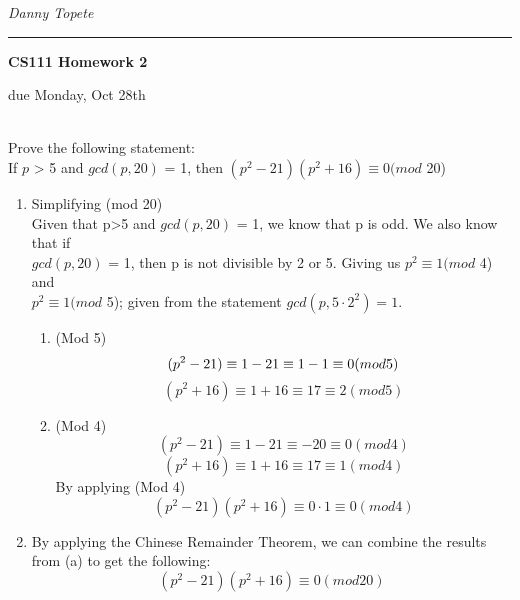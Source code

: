 \documentclass[11pt]{article}
\newcommand{\student}[1]{{\noindent\Large\em {#1} \hfill}\vskip 0.1in}
\newcommand{\assignment}[1]{\centerline{\large\bf CS111 Homework {#1}}}
\newcommand{\duedate}[1]{{\centerline{due {#1}}}}
\newcounter{prnum}
\newenvironment{problem}{{\vskip 0.2in\noindent\bf Problem
       \addtocounter{prnum}{1} \arabic{prnum}.}}{\vskip 0.1in}
\begin{document}
\student{Danny Topete} %
\vskip 0.1in\noindent\hrule\vskip 0.2in
\assignment{2}                           %
\duedate{Monday, Oct 28th}              %


\begin{problem}\\
Prove the following statement:\\
If $p$ > 5 and $gcd(p,20)$ = 1, then $(p^2 - 21)(p^2 + 16) \equiv 0 (mod$ 20)
\begin{enumerate}
  \item Simplifying (mod 20) \\
    Given that p>5 and $gcd(p,20)$ = 1, we know that p is odd.
    We also know that if \\
    $gcd(p,20)$ = 1, then p is not divisible by 2 or 5.
    Giving us $p^2 \equiv 1 (mod$ 4) and \\$p^2 \equiv 1 (mod$ 5);
    given from the statement $gcd(p, 5\cdot2^2)= 1.$\\
    \begin{enumerate}
      \item (Mod 5)\\
        \begin{equation*}
          (p^2 - 21)\equiv 1 - 21 \equiv 1-1 \equiv 0 (mod 5)\\
        \end{equation*}
        \begin{equation*}
          (p^2 + 16)\equiv 1 + 16 \equiv 17 \equiv 2 (mod 5)
        \end{equation*}
      \item (Mod 4)
        \begin{equation*}
          (p^2 - 21)\equiv 1-21 \equiv -20 \equiv 0 (mod 4)
        \end{equation*}
        \begin{equation*}
          (p^2 +16)\equiv 1 + 16 \equiv 17 \equiv 1 (mod 4)
        \end{equation*}
        By applying (Mod 4)
        \begin{equation*}
          (p^2 - 21)(p^2 + 16) \equiv 0\cdot1 \equiv 0 (mod 4)
        \end{equation*}
    \end{enumerate}
  \item By applying the Chinese Remainder Theorem, we can combine the results from (a) to get the following:
    \begin{equation*}
      (p^2 - 21)(p^2 + 16) \equiv 0 (mod 20)
    \end{equation*}
\end{enumerate}
  
\end{problem} 
\clearpage
\end{document}
